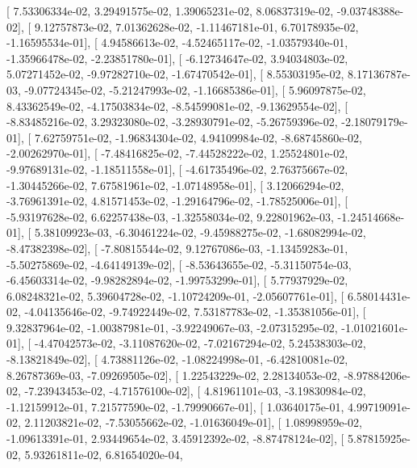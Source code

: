 \documentclass{article}
\begin{document}
       [  7.53306334e-02,   3.29491575e-02,   1.39065231e-02,
          8.06837319e-02,  -9.03748388e-02],
       [  9.12757873e-02,   7.01362628e-02,  -1.11467181e-01,
          6.70178935e-02,  -1.16595534e-01],
       [  4.94586613e-02,  -4.52465117e-02,  -1.03579340e-01,
         -1.35966478e-02,  -2.23851780e-01],
       [ -6.12734647e-02,   3.94034803e-02,   5.07271452e-02,
         -9.97282710e-02,  -1.67470542e-01],
       [  8.55303195e-02,   8.17136787e-03,  -9.07724345e-02,
         -5.21247993e-02,  -1.16685386e-01],
       [  5.96097875e-02,   8.43362549e-02,  -4.17503834e-02,
         -8.54599081e-02,  -9.13629554e-02],
       [ -8.83485216e-02,   3.29323080e-02,  -3.28930791e-02,
         -5.26759396e-02,  -2.18079179e-01],
       [  7.62759751e-02,  -1.96834304e-02,   4.94109984e-02,
         -8.68745860e-02,  -2.00262970e-01],
       [ -7.48416825e-02,  -7.44528222e-02,   1.25524801e-02,
         -9.97689131e-02,  -1.18511558e-01],
       [ -4.61735496e-02,   2.76375667e-02,  -1.30445266e-02,
          7.67581961e-02,  -1.07148958e-01],
       [  3.12066294e-02,  -3.76961391e-02,   4.81571453e-02,
         -1.29164796e-02,  -1.78525006e-01],
       [ -5.93197628e-02,   6.62257438e-03,  -1.32558034e-02,
          9.22801962e-03,  -1.24514668e-01],
       [  5.38109923e-03,  -6.30461224e-02,  -9.45988275e-02,
         -1.68082994e-02,  -8.47382398e-02],
       [ -7.80815544e-02,   9.12767086e-03,  -1.13459283e-01,
         -5.50275869e-02,  -4.64149139e-02],
       [ -8.53643655e-02,  -5.31150754e-03,  -6.45603314e-02,
         -9.98282894e-02,  -1.99753299e-01],
       [  5.77937929e-02,   6.08248321e-02,   5.39604728e-02,
         -1.10724209e-01,  -2.05607761e-01],
       [  6.58014431e-02,  -4.04135646e-02,  -9.74922449e-02,
          7.53187783e-02,  -1.35381056e-01],
       [  9.32837964e-02,  -1.00387981e-01,  -3.92249067e-03,
         -2.07315295e-02,  -1.01021601e-01],
       [ -4.47042573e-02,  -3.11087620e-02,  -7.02167294e-02,
          5.24538303e-02,  -8.13821849e-02],
       [  4.73881126e-02,  -1.08224998e-01,  -6.42810081e-02,
          8.26787369e-03,  -7.09269505e-02],
       [  1.22543229e-02,   2.28134053e-02,  -8.97884206e-02,
         -7.23943453e-02,  -4.71576100e-02],
       [  4.81961101e-03,  -3.19830984e-02,  -1.12159912e-01,
          7.21577590e-02,  -1.79990667e-01],
       [  1.03640175e-01,   4.99719091e-02,   2.11203821e-02,
         -7.53055662e-02,  -1.01636049e-01],
       [  1.08998959e-02,  -1.09613391e-01,   2.93449654e-02,
          3.45912392e-02,  -8.87478124e-02],
       [  5.87815925e-02,   5.93261811e-02,   6.81654020e-04,
\end{document}
